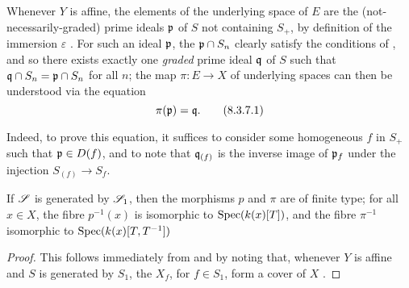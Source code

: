 \begin{remark}[8.3.7]
\label{II.8.3.7}
Whenever $Y$ is affine, the elements of the underlying space of $E$ are the (not-necessarily-graded) prime ideals $\mathfrak{p}$ of $S$ not containing $S_+$, by definition of the immersion $\varepsilon$ .
For such an ideal $\mathfrak{p}$, the $\mathfrak{p}\cap S_n$ clearly satisfy the conditions of , and so there exists exactly one \emph{graded} prime ideal $\mathfrak{q}$ of $S$ such that $\mathfrak{q}\cap S_n=\mathfrak{p}\cap S_n$ for all $n$;
the map $\pi:E\to X$ of underlying spaces can then be understood via the equation
\[
\label{II.8.3.7.1}
  \pi(\mathfrak{p}) = \mathfrak{q}.
\tag{8.3.7.1}
\]

Indeed, to prove this equation, it suffices to consider some homogeneous $f$ in $S_+$ such that $\mathfrak{p}\in D(f)$, and to note that $\mathfrak{q}_{(f)}$ is the inverse image of $\mathfrak{p}_f$ under the injection $S_{(f)}\to S_f$.
\end{remark}

\begin{corollary}[8.3.8]
\label{II.8.3.8}
If $\mathscr{S}$ is generated by $\mathscr{S}_1$, then the morphisms $p$ and $\pi$ are of finite type;
for all $x\in X$, the fibre $p^{-1}(x)$ is isomorphic to $\operatorname{Spec}(k(x)[T])$, and the fibre $\pi^{-1}$ isomorphic to $\operatorname{Spec}(k(x)[T,T^{-1}])$
\end{corollary}

\begin{proof}
This follows immediately from  and  by noting that, whenever $Y$ is affine and $S$ is generated by $S_1$, the $X_f$, for $f\in S_1$, form a cover of $X$ .
\end{proof}

